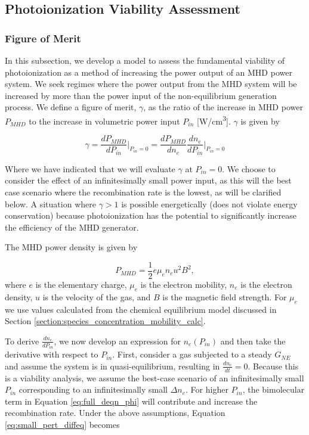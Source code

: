 \subsection{Photoionization Viability Assessment}

\subsubsection{Figure of Merit}

In this subsection, we develop a model to assess the fundamental viability of photoionization as a method of increasing the power output of an MHD power system. We seek regimes where the power output from the MHD system will be increased by more than the power input of the non-equilibrium generation process. We define a figure of merit, $\gamma$, as the ratio of the increase in MHD power $P_{MHD}$ to the increase in volumetric power input $P_{in}$ [\unit{\watt/\centi\meter^3}]. $\gamma$ is given by

\begin{equation}
  \label{eq:beta_def}
\gamma = \frac{dP_{MHD}}{dP_{in}} \Big|_{P_{in}=0} = \frac{dP_{MHD}}{dn_{e}}\frac{dn_{e}}{dP_{in}}\Big|_{P_{in}=0}
\end{equation}

Where we have indicated that we will evaluate $\gamma$ at $P_{in} = 0$. We choose to consider the effect of an infinitesimally small power input, as this will the best case scenario where the recombination rate is the lowest, as will be clarified below. A situation where $\gamma > 1$ is possible energetically (does not violate energy conservation) because photoionization has the potential to significantly increase the efficiency of the MHD generator. 

The MHD power density is given by

\begin{equation}
  \label{eq:mhd_power}
P_{MHD} = \frac{1}{2} e \mu_e n_e u^2 B^2,
\end{equation}
where $e$ is the elementary charge, $\mu_e$ is the electron mobility, $n_e$ is the electron density, $u$ is the velocity of the gas, and $B$ is the magnetic field strength. For $\mu_e$ we use values calculated from the chemical equilibrium model discussed in Section \ref{section:species_concentration_mobility_calc}.

To derive $\frac{dn_{e}}{dP_{in}}$, we now develop an expression for $n_e(P_{in})$ and then take the derivative with respect to $P_{in}$. First, consider a gas subjected to a steady $G_{NE}$ and assume the system is in quasi-equilibrium, resulting in $\frac{dn_{e}}{dt} = 0$. Because this is a viability analysis, we assume the best-case scenario of an infinitesimally small $P_{in}$ corresponding to an infinitesimally small $\Delta n_{e}$. For higher $P_{in}$, the bimolecular term in Equation \ref{eq:full_deqn_phi} will contribute and increase the recombination rate. Under the above assumptions, Equation \ref{eq:small_pert_diffeq} becomes

